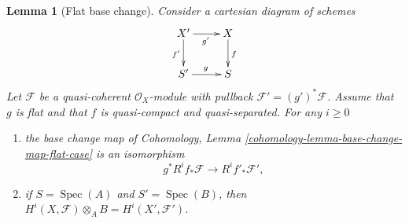 \documentclass{stacks-project}
\theoremstyle{plain}
\newtheorem{lemma}[subsection]{Lemma}
\theoremstyle{definition}
\theoremstyle{remark}
\numberwithin{equation}{subsection}
\def\Spec{\mathop{\mathrm{Spec}}}
\begin{document}
\begin{lemma}[Flat base change]
\label{lemma-flat-base-change-cohomology}
Consider a cartesian diagram of schemes
$$
\xymatrix{
X' \ar[d]_{f'} \ar[r]_{g'} & X \ar[d]^f \\
S' \ar[r]^g & S
}
$$
Let $\mathcal{F}$ be a quasi-coherent $\mathcal{O}_X$-module
with pullback $\mathcal{F}' = (g')^*\mathcal{F}$.
Assume that $g$ is flat and that $f$ is quasi-compact and quasi-separated.
For any $i \geq 0$
\begin{enumerate}
\item the base change map of
Cohomology, Lemma \ref{cohomology-lemma-base-change-map-flat-case}
is an isomorphism
$$
g^*R^if_*\mathcal{F} \longrightarrow R^if'_*\mathcal{F}',
$$
\item if $S = \Spec(A)$ and $S' = \Spec(B)$, then
$H^i(X, \mathcal{F}) \otimes_A B = H^i(X', \mathcal{F}')$.
\end{enumerate}
\end{lemma}
\end{document}
